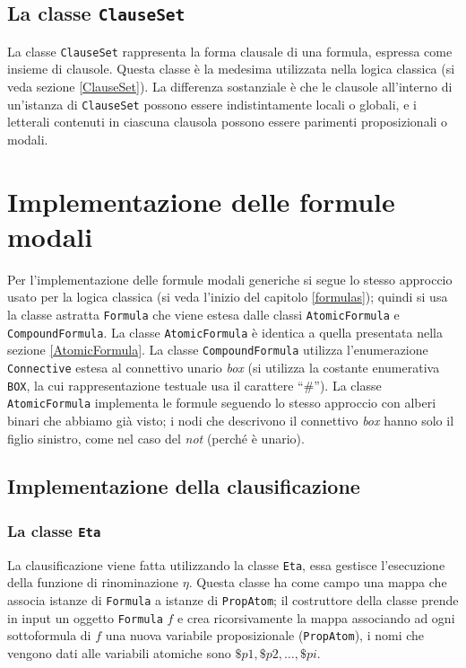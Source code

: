 \documentclass[a4paper,12pt]{report}
\begin{document}
\subsection*{La classe \texttt{ClauseSet}}
La classe \texttt{ClauseSet} rappresenta la forma clausale di una formula, espressa come insieme di clausole. Questa classe è la medesima utilizzata nella logica classica (si veda sezione \ref{ClauseSet}). La differenza sostanziale è che le clausole all'interno di un'istanza di \texttt{ClauseSet} possono essere indistintamente locali o globali, e i letterali contenuti in ciascuna clausola possono essere parimenti proposizionali o modali.


\section{Implementazione delle formule modali}
Per l'implementazione delle formule modali generiche si segue lo stesso approccio usato per la logica classica (si veda l'inizio del capitolo \ref{formulas}); quindi si usa la classe astratta \texttt{Formula} che viene estesa dalle classi \texttt{AtomicFormula} e \texttt{CompoundFormula}. La classe \texttt{AtomicFormula} è identica a quella presentata nella sezione \ref{AtomicFormula}. La classe \texttt{CompoundFormula} utilizza l'enumerazione \texttt{Connective} estesa al connettivo unario \emph{box} (si utilizza la costante enumerativa \texttt{BOX}, la cui rappresentazione testuale usa il carattere ``$\#$''). La classe \texttt{AtomicFormula} implementa le formule seguendo lo stesso approccio con alberi binari che abbiamo già visto; i nodi che descrivono il connettivo \emph{box} hanno solo il figlio sinistro, come nel caso del \emph{not} (perché è unario).

\subsection{Implementazione della clausificazione}
\label{clausification_impl}
\subsubsection{La classe \texttt{Eta}}
La clausificazione viene fatta utilizzando la classe \texttt{Eta}, essa gestisce l'esecuzione della funzione di rinominazione $\eta$. Questa classe ha come campo una mappa che associa istanze di \texttt{Formula} a istanze di \texttt{PropAtom}; il costruttore della classe prende in input un oggetto \texttt{Formula} $f$ e crea ricorsivamente la mappa associando ad ogni sottoformula di $f$ una nuova variabile proposizionale (\texttt{PropAtom}), i nomi che vengono dati alle variabili atomiche sono $\$p1, \$p2, \dots, \$pi$.
\end{document}
